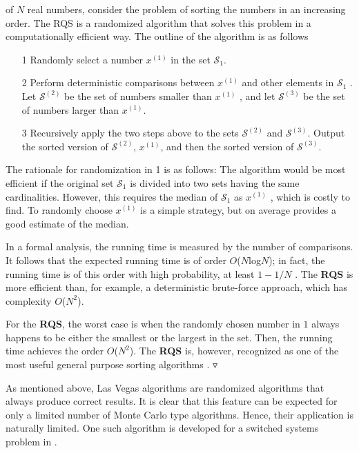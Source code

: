 \documentclass[12pt]{article}
\begin{document}
			of $N$ real numbers, consider the problem of sorting the numbers in an increasing order. The RQS is a randomized algorithm that solves this problem in a computationally efficient way. The outline of the algorithm is as follows
			\begin{itemize}
				\item[1]
				Randomly select a number $x^{(1)}$ in the set $\mathscr{S}_1$.
				\item[2]
				Perform deterministic comparisons between $x^{(1)}$ and other elements in $\mathscr{S}_1$ . Let $\mathscr{S}^{(2)}$ be the set of numbers smaller than $x^{(1)}$ , and let $\mathscr{S}^{(3)}$ be the set of numbers larger than $x^{(1)}$.
				\item[3]
				Recursively apply the two steps above to the sets $\mathscr{S}^{(2)}$ and $\mathscr{S}^{(3)}$. Output the sorted version of $\mathscr{S}^{(2)}$, $x^{(1)}$, and then the sorted version of $\mathscr{S}^{(3)}$.
			\end{itemize}
			\par
			The rationale for randomization in 1 is as follows: The algorithm would be most efficient if the original set $\mathscr{S}_1$ is divided into two sets having the same cardinalities. However, this requires the median of $\mathscr{S}_1$ as $x^{(1)}$ , which is costly to find. To randomly choose $x^{(1)}$ is a simple strategy, but on average provides a good estimate of the median.
			\par
			In a formal analysis, the running time is measured by the number of comparisons. It follows that the expected running time is of order $O$($N$log$N$); in fact, the running time is of this order with high probability, at least $1 − 1/N$ \cite{bib15}. The \textbf{RQS} is more efficient than, for example, a deterministic brute-force approach, which has complexity $O$($N^2$). 
			\par
			For the \textbf{RQS}, the worst case is when the randomly chosen number in $1$ always happens to be either the smallest or the largest in the set. Then, the running time achieves the order $O$($N^2$). The \textbf{RQS} is, however, recognized as one of the most useful general purpose sorting algorithms \cite{bib14}. $\triangledown$
			\par
			As mentioned above, Las Vegas algorithms are randomized algorithms that always produce correct results. It is clear that this feature can be expected for only a limited number of Monte Carlo type algorithms. Hence, their application is naturally limited. One such algorithm is developed for a switched systems problem in \cite{bib11}.
			\par
\end{document}
